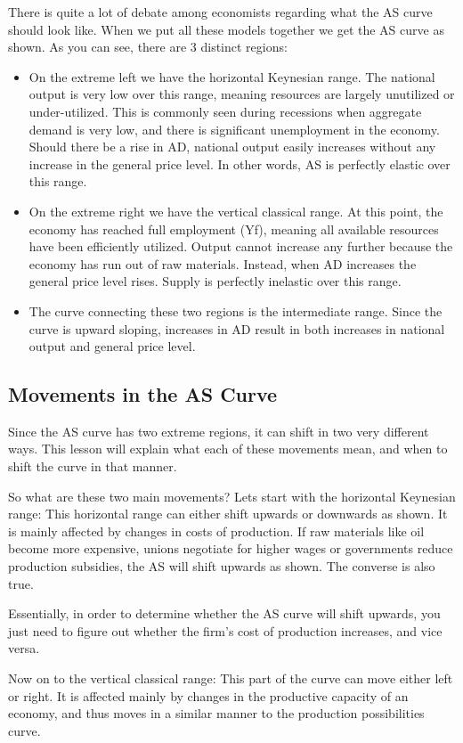 There is quite a lot of debate among economists regarding what the AS curve should look like. When we put all these models together we get the AS curve as shown. As you can see, there are 3 distinct regions:
\begin{itemize}
\item On the extreme left we have the horizontal Keynesian range. The national output is very low over this range, meaning resources are largely unutilized or under-utilized. This is commonly seen during recessions when aggregate demand is very low, and there is significant unemployment in the economy. Should there be a rise in AD, national output easily increases without any increase in the general price level. In other words, AS is perfectly elastic over this range. 
\item On the extreme right we have the vertical classical range. At this point, the economy has reached full employment (Yf), meaning all available resources have been efficiently utilized. Output cannot increase any further because the economy has run out of raw materials. Instead, when AD increases the general price level rises. Supply is perfectly inelastic over this range.
\item The curve connecting these two regions is the intermediate range. Since the curve is upward sloping, increases in AD result in both increases in national output and general price level. 
\end{itemize}
\subsection{Movements in the AS Curve}
Since the AS curve has two extreme regions, it can shift in two very different ways. This lesson will explain what each of these movements mean, and when to shift the curve in that manner. 

So what are these two main movements? Lets start with the horizontal Keynesian range:
This horizontal range can either shift upwards or downwards as shown. It is mainly affected by changes in costs of production. If raw materials like oil become more expensive, unions negotiate for higher wages or governments reduce production subsidies, the AS will shift upwards as shown. The converse is also true. 

Essentially, in order to determine whether the AS curve will shift upwards, you just need to figure out whether the firm’s cost of production increases, and vice versa. 

Now on to the vertical classical range: This part of the curve can move either left or right. It is affected mainly by changes in the productive capacity of an economy, and thus moves in a similar manner to the production possibilities curve.

